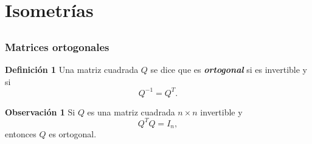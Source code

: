 \section{Isometrías}

\subsection{}

\begin{frame}\frametitle{Matrices ortogonales}

	\begin{block}{\textbf{Definición 1  }}
		\justifying
		Una matriz cuadrada $Q$ se dice que es  \textbf{\textit{ortogonal}} si es invertible y si 
		\[
			Q^{-1} = Q^T.
		\]
	\end{block}
	
	\begin{alertblock}{\textbf{Observación 1}}
		Si $Q$ es una matriz cuadrada $n\times n$ invertible y
		\[
			 Q^TQ = I_n,
		\]
		entonces $Q$ es ortogonal.
	\end{alertblock}
	
\end{frame}


\subsection{}

